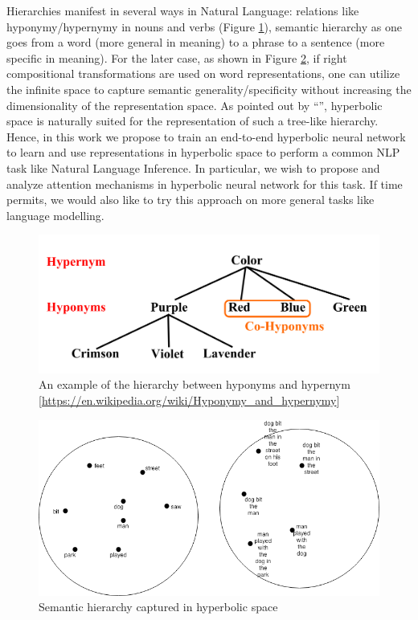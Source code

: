 \documentclass[11pt,a4paper]{article}
\newcommand{\figref}[1]{Figure \ref{#1}}
\begin{document}
Hierarchies manifest in several ways in Natural Language: relations like hyponymy/hypernymy in nouns and verbs (\figref{fig:hypernyms}), semantic hierarchy as one goes from a word (more general in meaning) to a phrase to a sentence (more specific in meaning). For the later case, as shown in \figref{fig:semantic_hierarchy}, if right compositional transformations are used on word representations, one can utilize the infinite space to capture semantic generality/specificity without increasing the dimensionality of the representation space.  As pointed out by ``'', hyperbolic space is naturally suited for the representation of such a tree-like hierarchy. Hence, in this work we propose to train an end-to-end hyperbolic neural network to learn and use representations in hyperbolic space to perform a common NLP task like Natural Language Inference. In particular, we wish to propose and analyze attention mechanisms in hyperbolic neural network for this task. If time permits, we would also like to try this approach on more general tasks like language modelling. 

\begin{figure}
    \centering
    \includegraphics[width=\linewidth]{figs/hypernyms.png}
    \caption{An example of the hierarchy between hyponyms and hypernym [\url{https://en.wikipedia.org/wiki/Hyponymy_and_hypernymy}]}
    \label{fig:hypernyms}
\end{figure}

\begin{figure}
    \centering
    \includegraphics[width=\linewidth]{figs/semantic_hierrachy_captured.png}
    \caption{Semantic hierarchy captured in hyperbolic space}
    \label{fig:semantic_hierarchy}
\end{figure}
\end{document}
